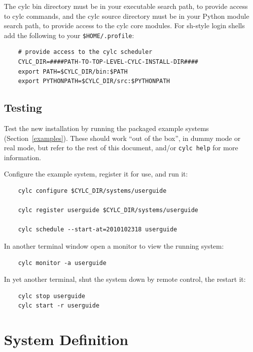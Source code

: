 \documentclass[11pt,a4paper]{article}
\begin{document}
The cylc bin directory must be in your executable search path, to
provide access to cylc commands, and the cylc source directory must be
in your Python module search path, to provide access to the cylc core
modules. For sh-style login shells add the following to
your \lstinline=$HOME/.profile=:

\lstset{language=bash} 

\begin{lstlisting}
    # provide access to the cylc scheduler
    CYLC_DIR=####PATH-TO-TOP-LEVEL-CYLC-INSTALL-DIR####
    export PATH=$CYLC_DIR/bin:$PATH
    export PYTHONPATH=$CYLC_DIR/src:$PYTHONPATH
\end{lstlisting}

\subsection{Testing} 
\label{Testing}

Test the new installation by running the packaged example systems
(Section~\ref{examples}). These should work ``out of the box'', in
dummy mode or real mode, but refer to the rest of this document, and/or
\lstinline=cylc help= for more information.  

Configure the example system, register it for use, and run it:

\begin{lstlisting}
    cylc configure $CYLC_DIR/systems/userguide

    cylc register userguide $CYLC_DIR/systems/userguide

    cylc schedule --start-at=2010102318 userguide
\end{lstlisting}

In another terminal window open a monitor to view the running system:

\begin{lstlisting}
    cylc monitor -a userguide
\end{lstlisting}

In yet another terminal, shut the system down by remote control,
the restart it:

\begin{lstlisting}
    cylc stop userguide
    cylc start -r userguide
\end{lstlisting}

\pagebreak
\section{System Definition} 
\label{SystemDefinition}
\end{document}
